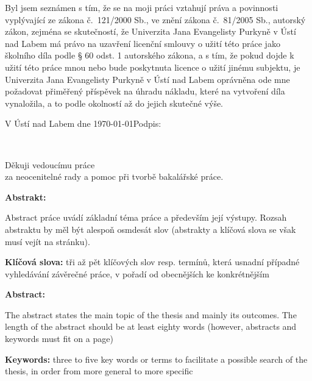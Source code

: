 \documentclass[male,czech,api_bc]{kitheses}
\newcommand{\ZT}[1]{\colorbox{yellow}{\color{red}{#1}}}
\newcommand{\nazevcz}{\ZT{Závěrečná práce na KI PřF UJEP}}        %
\newcommand{\nazeven}{\ZT{Thesis on KI PřF}}     %
\newcommand{\vedouciDAT}{\ZT{RNDr. Jiřímu Škvorovi, Ph.D.}}
\begin{document}
Byl jsem seznámen 
s tím, že se na moji práci vztahují práva a povinnosti vyplývající ze
zákona č.~121/2000 Sb., ve znění zákona č.~81/2005 Sb., autorský zákon, zejména se
skutečností, že Univerzita Jana Evangelisty Purkyně v Ústí nad Labem má právo na uzavření
licenční smlouvy o užití této práce jako školního díla podle § 60 odst. 1 autorského zákona, a
s tím, že pokud dojde k užití této práce mnou nebo bude poskytnuta licence o užití jinému
subjektu, je Univerzita Jana Evangelisty Purkyně v Ústí nad Labem oprávněna ode mne
požadovat přiměřený příspěvek na úhradu nákladu, které na vytvoření díla vynaložila, a to
podle okolností až do jejich skutečné výše.

\vspace{2em}

V Ústí nad Labem dne \today   \hfill Podpis: \makebox[4cm][s]{\dotfill}

\cleardoublepage
\thispagestyle{empty}
~
\vfill

\begin{flushright}
    Děkuji vedoucímu práce \ZT{\vedouciDAT}\\ 
    za neocenitelné rady a pomoc při tvorbě bakalářské práce.
\end{flushright}

\cleardoublepage

\textsc{\nazevcz}

\textbf{Abstrakt:}

Abstract práce uvádí základní téma práce a především její výstupy. Rozsah abstraktu by měl být alespoň osmdesát slov (abstrakty a klíčová slova se však musí vejít na stránku).

\textbf{Klíčová slova:} tři až pět klíčových slov resp. termínů, která usnadní případné vyhledávání závěrečné práce, v pořadí od obecnějších ke konkrétnějším

\bigskip


\textsc{\nazeven}

\textbf{Abstract:}

The abstract states the main topic of the thesis and mainly its outcomes. The length of the abstract should be at least eighty words (however, abstracts and keywords must fit on a page)

\textbf{Keywords:} three to five key words or terms to facilitate a possible search of the thesis, in order from more general to more specific

\tableofcontents
\end{document}
